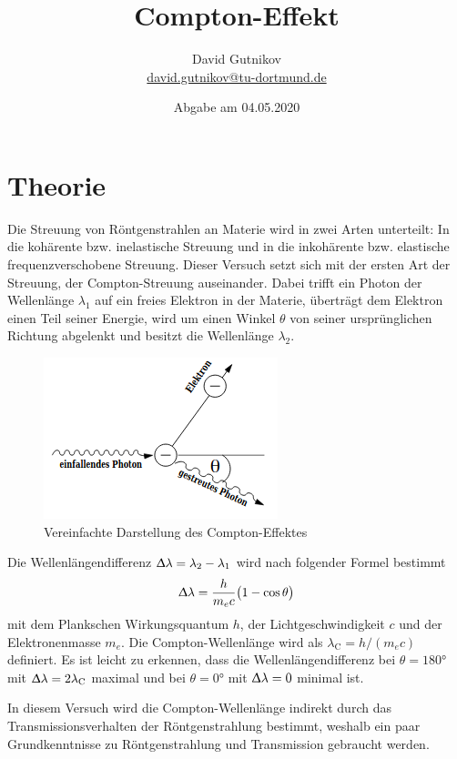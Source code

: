 \documentclass[titlepage = firstcover]{scrartcl}
\title{Compton-Effekt}
\author{David Gutnikov \\
        \href{mailto:david.gutnikov@tu-dortmund.de}{david.gutnikov@tu-dortmund.de}}
\date{Abgabe am 04.05.2020}
\begin{document}
    \maketitle
    \newpage
    \tableofcontents
    \newpage

    \section{Theorie}
      Die Streuung von Röntgenstrahlen an Materie wird in zwei Arten unterteilt: In die kohärente bzw. inelastische Streuung und in die inkohärente bzw. elastische frequenzverschobene Streuung. Dieser Versuch setzt sich mit der ersten Art der Streuung, der Compton-Streuung auseinander. Dabei trifft ein Photon der Wellenlänge $\lambda_1$ auf ein freies Elektron in der Materie, überträgt dem Elektron einen Teil seiner Energie, wird um einen Winkel $\theta$ von seiner ursprünglichen Richtung abgelenkt und besitzt die Wellenlänge $\lambda_2$.
      \begin{figure}[h]
        \centering
        \includegraphics[width = 0.35\linewidth]{ComptoneffektSkizze.png}
        \caption{Vereinfachte Darstellung des Compton-Effektes}
        \label{fig:comptoneffekt}
      \end{figure}
      \FloatBarrier

      Die Wellenlängendifferenz $\Updelta\lambda = \lambda_2 - \lambda_1$ wird nach folgender Formel bestimmt
      \begin{equation}
        \Updelta\lambda = \frac{h}{m_e c}\bigl(1 - \cos{\theta}\bigr)
        \label{eqn:compton}
      \end{equation}
      mit dem Plankschen Wirkungsquantum $h$, der Lichtgeschwindigkeit $c$ und der Elektronenmasse $m_e$. Die Compton-Wellenlänge wird als $\lambda_\text{C} = h / (m_e c)$ definiert. Es ist leicht zu erkennen, dass die Wellenlängendifferenz bei $\theta = 180°$ mit $\Updelta\lambda = 2\lambda_\text{C}$ maximal und bei $\theta = 0°$ mit $\Updelta\lambda = 0$ minimal ist.

      In diesem Versuch wird die Compton-Wellenlänge indirekt durch das Transmissionsverhalten der Röntgenstrahlung bestimmt, weshalb ein paar Grundkenntnisse zu Röntgenstrahlung und Transmission gebraucht werden.
\end{document}
